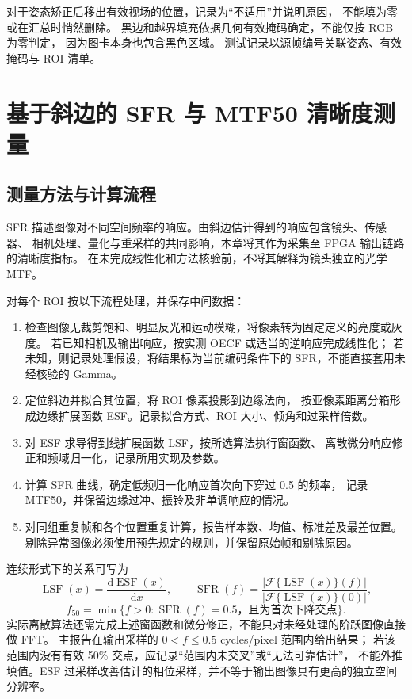 对于姿态矫正后移出有效视场的位置，记录为“不适用”并说明原因，
不能填为零或在汇总时悄然删除。
黑边和越界填充依据几何有效掩码确定，不能仅按 RGB 为零判定，
因为图卡本身也包含黑色区域。
测试记录以源帧编号关联姿态、有效掩码与 ROI 清单。


\section{基于斜边的 SFR 与 MTF50 清晰度测量}
\subsection{测量方法与计算流程}
SFR 描述图像对不同空间频率的响应。由斜边估计得到的响应包含镜头、传感器、
相机处理、量化与重采样的共同影响，本章将其作为采集至 FPGA 输出链路的清晰度指标。
在未完成线性化和方法核验前，不将其解释为镜头独立的光学 MTF。

对每个 ROI 按以下流程处理，并保存中间数据：
\begin{enumerate}
\item 检查图像无裁剪饱和、明显反光和运动模糊，将像素转为固定定义的亮度或灰度。
若已知相机及输出响应，按实测 OECF 或适当的逆响应完成线性化；
若未知，则记录处理假设，将结果标为当前编码条件下的 SFR，不能直接套用未经核验的 Gamma。
\item 定位斜边并拟合其位置，将 ROI 像素投影到边缘法向，
按亚像素距离分箱形成边缘扩展函数 ESF。记录拟合方式、ROI 大小、倾角和过采样倍数。
\item 对 ESF 求导得到线扩展函数 LSF，按所选算法执行窗函数、
离散微分响应修正和频域归一化，记录所用实现及参数。
\item 计算 SFR 曲线，确定低频归一化响应首次向下穿过 0.5 的频率，
记录 MTF50，并保留边缘过冲、振铃及非单调响应的情况。
\item 对同组重复帧和各个位置重复计算，报告样本数、均值、标准差及最差位置。
剔除异常图像必须使用预先规定的规则，并保留原始帧和剔除原因。
\end{enumerate}

连续形式下的关系可写为
\begin{equation}
\operatorname{LSF}(x)=\frac{\mathrm{d}\operatorname{ESF}(x)}{\mathrm{d}x},\qquad
\operatorname{SFR}(f)=
\frac{\left|\mathcal{F}\{\operatorname{LSF}(x)\}(f)\right|}
{\left|\mathcal{F}\{\operatorname{LSF}(x)\}(0)\right|},
\end{equation}
\begin{equation}
f_{50}=\min\{f>0:\operatorname{SFR}(f)=0.5
\text{，且为首次下降交点}\}.
\label{eq:quality-mtf50}
\end{equation}
实际离散算法还需完成上述窗函数和微分修正，不能只对未经处理的阶跃图像直接做 FFT。
主报告在输出采样的 $0<f\le0.5$ cycles/pixel 范围内给出结果；
若该范围内没有有效 50\% 交点，应记录“范围内未交叉”或“无法可靠估计”，
不能外推填值。ESF 过采样改善估计的相位采样，并不等于输出图像具有更高的独立空间分辨率。

